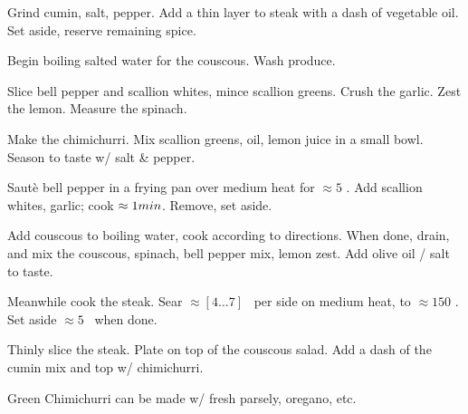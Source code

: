 \begin{preparation}
\item Grind cumin, salt, pepper.
	Add a thin layer to steak with a dash of vegetable oil.
	Set aside, reserve remaining spice.

\item Begin boiling salted water for the couscous.
	Wash produce.

\item Slice bell pepper and scallion whites, mince scallion greens.
	Crush the garlic.
	Zest the lemon.
	Measure the spinach.

\item Make the chimichurri.
	Mix scallion greens, oil, lemon juice in a small bowl.
	Season to taste w/ salt \& pepper.

\item Saut\`{e} bell pepper in a frying pan over medium heat for $\approx 5$ \minute.
	Add scallion whites, garlic; cook $\approx 1 \minute$.
	Remove, set aside.

\item Add couscous to boiling water, cook according to directions.
	When done, drain, and mix the couscous, spinach, bell pepper mix, lemon zest.
	Add olive oil / salt to taste.

\item Meanwhile cook the steak.
	Sear $\approx [4 \dots 7]$ \minute~per side on medium heat, to $\approx 150$ \Fahrenheit.
	Set aside $\approx 5$ \minute~when done.

\item Thinly slice the steak.
	Plate on top of the couscous salad.
	Add a dash of the cumin mix and top w/ chimichurri.
\end{preparation}


\begin{variation}
\item Green Chimichurri can be made w/ fresh parsely, oregano, etc.
\end{variation}


\recipeend%
